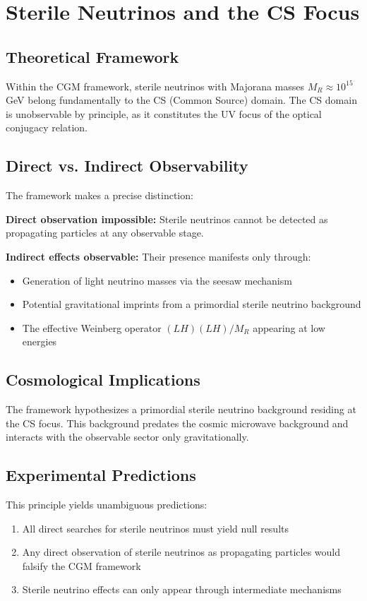\documentclass[11pt,a4paper]{article}
\theoremstyle{definition}
\theoremstyle{remark}
\begin{document}
\section{Sterile Neutrinos and the CS Focus}

\subsection{Theoretical Framework}

Within the CGM framework, sterile neutrinos with Majorana masses $M_R \approx 10^{15}$ GeV belong fundamentally to the CS (Common Source) domain. The CS domain is unobservable by principle, as it constitutes the UV focus of the optical conjugacy relation.

\subsection{Direct vs. Indirect Observability}

The framework makes a precise distinction:

\textbf{Direct observation impossible:} Sterile neutrinos cannot be detected as propagating particles at any observable stage.

\textbf{Indirect effects observable:} Their presence manifests only through:
\begin{itemize}
\item Generation of light neutrino masses via the seesaw mechanism
\item Potential gravitational imprints from a primordial sterile neutrino background
\item The effective Weinberg operator $(LH)(LH)/M_R$ appearing at low energies
\end{itemize}

\subsection{Cosmological Implications}

The framework hypothesizes a primordial sterile neutrino background residing at the CS focus. This background predates the cosmic microwave background and interacts with the observable sector only gravitationally.

\subsection{Experimental Predictions}

This principle yields unambiguous predictions:
\begin{enumerate}
\item All direct searches for sterile neutrinos must yield null results
\item Any direct observation of sterile neutrinos as propagating particles would falsify the CGM framework
\item Sterile neutrino effects can only appear through intermediate mechanisms
\end{enumerate}
\end{document}
